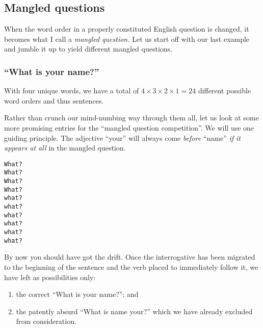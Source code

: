 \documentclass[
  11pt,
  british,
  a4paper,
]{article}
\providecommand{\tightlist}{%
  \setlength{\itemsep}{0pt}\setlength{\parskip}{0pt}}
\begin{document}
\hypertarget{mangled-questions}{%
\subsection{Mangled questions}\label{mangled-questions}}

When the word order in a properly constituted English question is
changed, it becomes what I call a \emph{mangled question.} Let us start
off with our last example and jumble it up to yield different mangled
questions.

\hypertarget{what-is-your-name-1}{%
\subsubsection{``What is your name?''}\label{what-is-your-name-1}}

With four unique words, we have a total of
\(4 \times 3 \times 2 \times 1 = 24\) different possible word orders and
thus sentences.

Rather than crunch our mind-numbing way through them all, let us look at
some more promising entries for the ``mangled question competition''. We
will use one guiding principle. The adjective ``your'' will always come
\emph{before} ``name'' \emph{if it appears at all} in the mangled
question.

\begin{tcolorbox}
\begin{alltt}
\color{normal}
What ?
What  ?
What   ?
What   ?
 what?
  what?
 what ?
  what?
   what?
  what ?
\end{alltt}
\end{tcolorbox}

By now you should have got the drift. Once the interrogative has been
migrated to the beginning of the sentence and the verb placed to
immediately follow it, we have left as possibilities only:

\begin{enumerate}
\def\labelenumi{\alph{enumi}.}
\tightlist
\item
  the correct ``What is your name?''; and
\item
  the patently absurd ``What is name your?'' which we have already
  excluded from consideration.
\end{enumerate}
\end{document}
